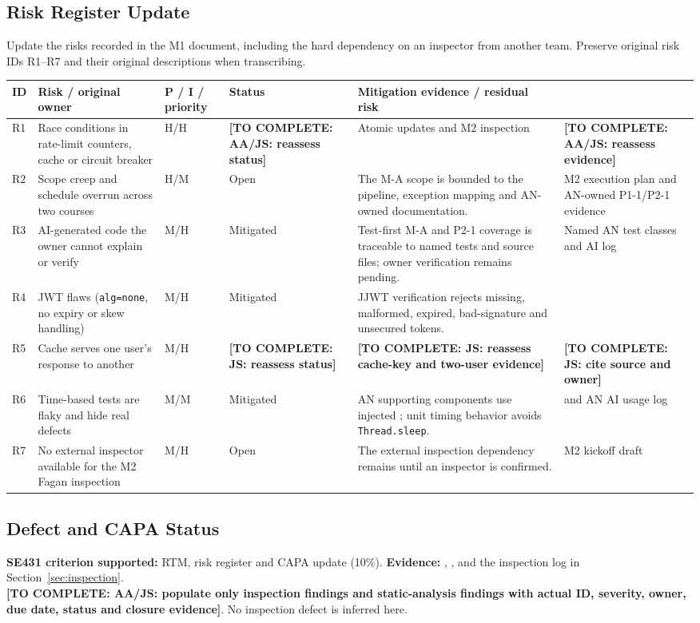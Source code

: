 \documentclass[11pt,a4paper]{article}
\newcommand{\todo}[1]{\textcolor{red!70!black}{\textbf{[TO COMPLETE: #1]}}}
\begin{document}
\subsection{Risk Register Update}
Update the risks recorded in the M1 document, including the hard dependency on an inspector from another team. Preserve original risk IDs R1--R7 and their original descriptions when transcribing.
\begin{longtable}{L{1.1cm} L{3.5cm} L{2.1cm} L{2.4cm} L{3.5cm}}\toprule
\textbf{ID} & \textbf{Risk / original owner} & \textbf{P / I / priority} & \textbf{Status} & \textbf{Mitigation evidence / residual risk}\\\midrule\endhead
R1 & Race conditions in rate-limit counters, cache or circuit breaker & H/H & \todo{AA/JS: reassess status} & Atomic updates and M2 inspection & \todo{AA/JS: reassess evidence}\\
R2 & Scope creep and schedule overrun across two courses & H/M & Open & The M-A scope is bounded to the pipeline, exception mapping and AN-owned documentation. & M2 execution plan and AN-owned P1-1/P2-1 evidence\\
R3 & AI-generated code the owner cannot explain or verify & M/H & Mitigated & Test-first M-A and P2-1 coverage is traceable to named tests and source files; owner verification remains pending. & Named AN test classes and AI log\\
R4 & JWT flaws (\texttt{alg=none}, no expiry or skew handling) & M/H & Mitigated & JJWT verification rejects missing, malformed, expired, bad-signature and unsecured tokens. & \\
R5 & Cache serves one user's response to another & M/H & \todo{JS: reassess status} & \todo{JS: reassess cache-key and two-user evidence} & \todo{JS: cite source and owner}\\
R6 & Time-based tests are flaky and hide real defects & M/M & Mitigated & AN supporting components use injected ; unit timing behavior avoids \texttt{Thread.sleep}. &  and AN AI usage log\\
R7 & No external inspector available for the M2 Fagan inspection & M/H & Open & The external inspection dependency remains until an inspector is confirmed. & M2 kickoff draft\\\bottomrule\end{longtable}
\subsection{Defect and CAPA Status}
\textbf{SE431 criterion supported:} RTM, risk register and CAPA update (10\%). \textbf{Evidence:} , , and the inspection log in Section~\ref{sec:inspection}.\\
\todo{AA/JS: populate only inspection findings and static-analysis findings with actual ID, severity, owner, due date, status and closure evidence}. No inspection defect is inferred here.
\end{document}
